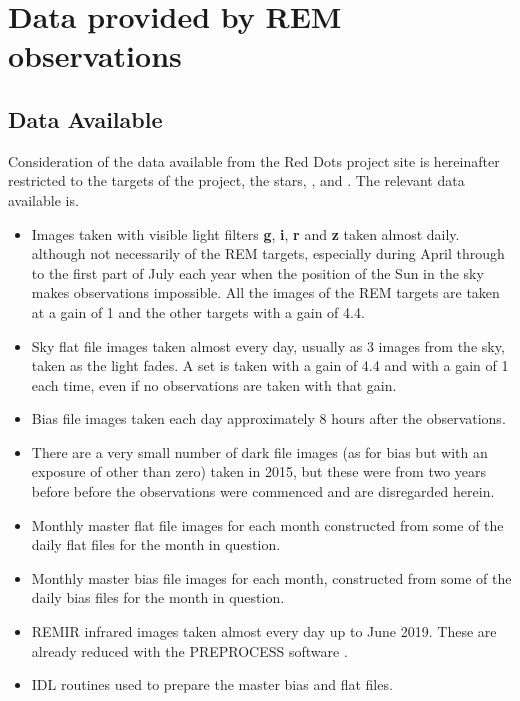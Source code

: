 \section{Data provided by REM observations}
\protect\label{section:tdataprovided}

\subsection{Data Available}

Consideration of the data available from the Red Dots project site is
hereinafter restricted to the targets of the project, the {\rdwarf} stars,
\prox, {\bstar} and \ross. The relevant data available is.

\begin{itemize}
 \item Images taken with visible light filters \textbf{g},
\textbf{i}, \textbf{r} and \textbf{z} taken almost daily. although not
necessarily of the REM {\rdwarf} targets, especially during April through to the
first part of July each year when the position of the Sun in the sky makes
observations impossible. All the images of the REM {\rdwarf} targets are taken
at a gain of 1 and the other targets with a gain of 4.4. 
\item Sky flat file images taken almost every day, usually as 3 images from the
sky, taken as the light fades. A set is taken with a gain of 4.4 and with a gain
of 1 each time, even if no observations are taken with that gain.
\item Bias file images taken each day
approximately 8 hours after the observations.
\item There are a very small number of dark file images (as for bias but with
an exposure of other than zero) taken in 2015, but these were from two years
before before the {\rdwarf} observations were commenced and are disregarded
herein.
\item Monthly master flat file images for each month constructed from some of
the daily flat files for the month in question.
\item Monthly master bias file images for each month, constructed from some of
the daily bias files for the month in question.
\item REMIR infrared images taken almost every day up to June 2019. These are
already reduced with the PREPROCESS software \citep{dipaola01}.
\item IDL routines used to prepare the master bias and flat files.
\end{itemize}

